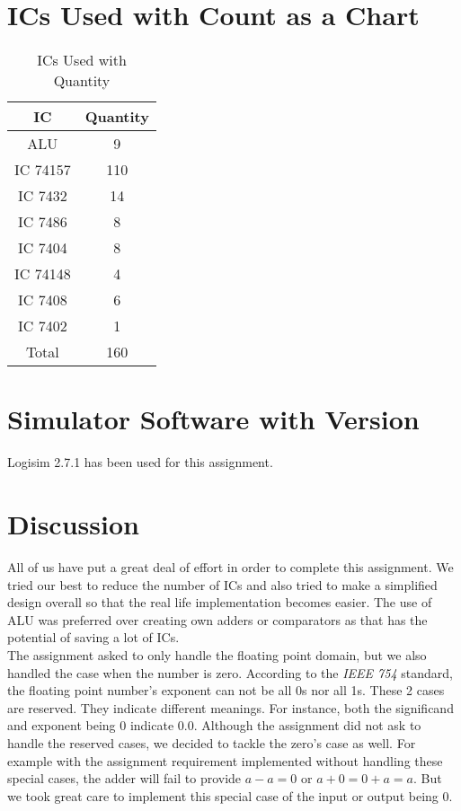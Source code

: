\documentclass[14pt]{article}
\begin{document}
\section{ICs Used with Count as a Chart}
\begin{table}[!h]
	\begin{center}
		\begin{tabular}{c c}
			\textbf{IC} & \textbf{Quantity}\\
			\hline
			\hline
			ALU & 9\\
			IC 74157 & 110\\
			IC 7432 & 14\\
			IC 7486 & 8\\
			IC 7404 & 8\\
			IC 74148 & 4\\
			IC 7408 & 6\\
			IC 7402 & 1\\
			\hline
			Total & 160
		\end{tabular}
		\caption{ICs Used with Quantity}
	\end{center}
\end{table}

\section{Simulator Software with Version}
Logisim 2.7.1 has been used for this assignment.

\section{Discussion}
All of us have put a great deal of effort in order to complete this assignment. We tried our best to reduce the number of ICs and also tried to make a simplified design overall so that the real life implementation becomes easier. The use of ALU was preferred over creating own adders or comparators as that has the potential of saving a lot of ICs.\\

The assignment asked to only handle the floating point domain, but we also handled the case when the number is zero. According to the \textit{IEEE 754} standard, the floating point number's exponent can not be all 0s nor all 1s. These 2 cases are reserved. They indicate different meanings. For instance, both the significand and exponent being 0 indicate $0.0$. Although the assignment did not ask to handle the reserved cases, we decided to tackle the zero's case as well. For example with the assignment requirement implemented without handling these special cases, the adder will fail to provide $a - a = 0$ or $a + 0 = 0 + a = a$. But we took great care to implement this special case of the input or output being 0.\\
\end{document}
